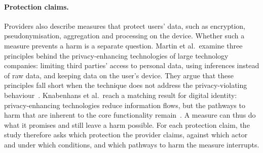 \paragraph{Protection claims.} Providers also describe measures that protect
users' data, such as encryption, pseudonymisation, aggregation and processing
on the device. Whether such a measure prevents a harm is a separate question.
Martin et al.\ examine three principles behind the privacy-enhancing
technologies of large technology companies: limiting third parties' access to
personal data, using inferences instead of raw data, and keeping data on the
user's device. They argue that these principles fall short when the technique
does not address the privacy-violating
behaviour~\parencite{martin2025cookies}. Knabenhans et al.\ reach a matching
result for digital identity: privacy-enhancing technologies reduce information
flows, but the pathways to harm that are inherent to the core functionality
remain~\parencite{knabenhans2026harms}. A measure can thus do what it promises
and still leave a harm possible. For each protection claim, the study therefore
asks which protection the provider claims, against which actor and under which
conditions, and which pathways to harm the measure interrupts.
